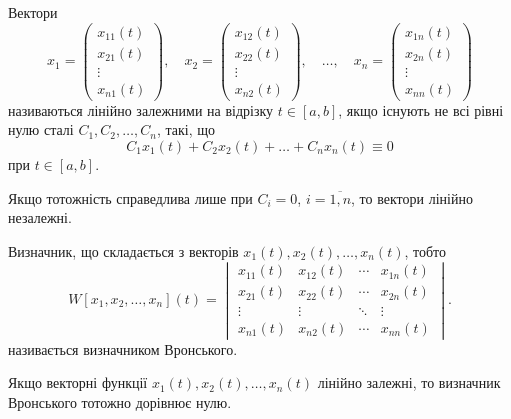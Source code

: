 \begin{definition}
	Вектори \[ x_1 = \begin{pmatrix} x_{11}(t) \\ x_{21}(t) \\ \vdots \\ x_{n1}(t) \end{pmatrix}, \quad x_2 = \begin{pmatrix} x_{12}(t) \\ x_{22}(t) \\ \vdots \\ x_{n2}(t) \end{pmatrix}, \quad \ldots, \quad x_n = \begin{pmatrix} x_{1n}(t) \\ x_{2n}(t) \\ \vdots \\ x_{nn}(t) \end{pmatrix} \] називаються лінійно залежними на відрізку $t \in [a, b]$, якщо існують не всі рівні нулю сталі $C_1, C_2, \ldots, C_n$, такі, що 
	\begin{equation*}
		C_1 x_1(t) + C_2 x_2(t) + \ldots + C_n x_n(t) \equiv 0
	\end{equation*}
	при $t \in [a, b]$. \parvskip

	Якщо тотожність справедлива лише при $C_i = 0$, $i = \overline{1, n}$, то вектори лінійно незалежні.
\end{definition}

\begin{definition}
	Визначник, що складається з векторів $x_1(t), x_2(t), \ldots, x_n(t)$, тобто
	\begin{equation*}
		W[x_1, x_2, \ldots, x_n](t) = \begin{vmatrix} x_{11}(t) & x_{12}(t) & \cdots & x_{1n}(t) \\ x_{21}(t) & x_{22}(t) & \cdots & x_{2n}(t) \\ \vdots & \vdots & \ddots & \vdots \\ x_{n1}(t) & x_{n2}(t) & \cdots & x_{nn}(t) \end{vmatrix}.
	\end{equation*}
	називається визначником Вронського.
\end{definition}

\begin{theorem}
	Якщо векторні функції $x_1(t), x_2(t), \ldots, x_n(t)$ лінійно залежні, то визначник Вронського тотожно дорівнює нулю.
\end{theorem}

